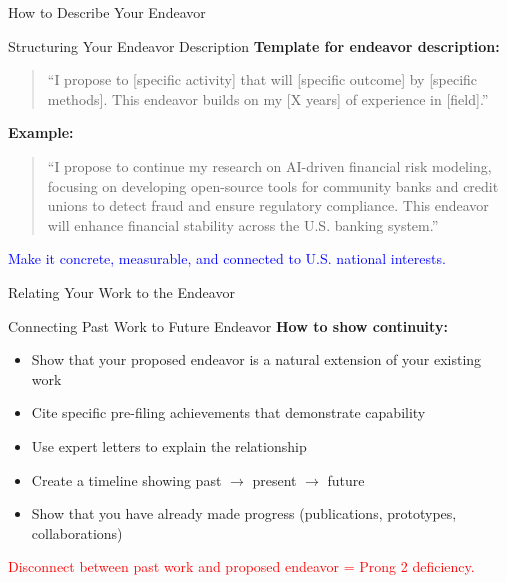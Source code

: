 \documentclass[11pt]{beamer}
\begin{document}
	\begin{frame}{How to Describe Your Endeavor}
		\scriptsize
		\begin{block}{Structuring Your Endeavor Description}
			\textbf{Template for endeavor description:}
			\vspace{0.2cm}
			\begin{quote}
				``I propose to [specific activity] that will [specific outcome] by [specific methods]. This endeavor builds on my [X years] of experience in [field].''
			\end{quote}
			\textbf{Example:}
			\begin{quote}
				``I propose to continue my research on AI-driven financial risk modeling, focusing on developing open-source tools for community banks and credit unions to detect fraud and ensure regulatory compliance. This endeavor will enhance financial stability across the U.S. banking system.''
			\end{quote}
			\textcolor{blue}{Make it concrete, measurable, and connected to U.S. national interests.}
		\end{block}
	\end{frame}
	
	\begin{frame}{Relating Your Work to the Endeavor}
		\scriptsize
		\begin{block}{Connecting Past Work to Future Endeavor}
			\textbf{How to show continuity:}
			\begin{itemize}
				\item Show that your proposed endeavor is a natural extension of your existing work
				\item Cite specific pre-filing achievements that demonstrate capability
				\item Use expert letters to explain the relationship
				\item Create a timeline showing past $\rightarrow$ present $\rightarrow$ future
				\item Show that you have already made progress (publications, prototypes, collaborations)
			\end{itemize}
			\textcolor{red}{Disconnect between past work and proposed endeavor = Prong 2 deficiency.}
		\end{block}
	\end{frame}
	
	
\end{document}
